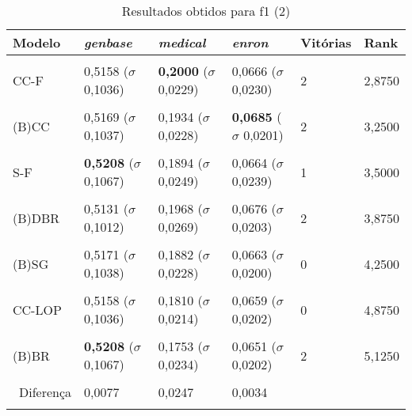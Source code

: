 \begin{table}[htbp]
	\centering
	\caption{Resultados obtidos para f1 (2)}
		\begin{tabular}
        { p{0.88in} p{0.88in} p{0.88in} p{0.88in} p{0.88in} p{0.88in} }
        
        \hline
Modelo & \textit{genbase} & \textit{medical} & \textit{enron} & \textbf{Vitórias} & \textbf{Rank} \\ 
\hline \\

CC-F & 0,5158 \newline ($\sigma$ 0,1036) & \textbf{0,2000} \newline ($\sigma$ 0,0229) & 0,0666 \newline ($\sigma$ 0,0230) & 2 & 2,8750 \\ \\
(B)CC & 0,5169 \newline ($\sigma$ 0,1037) & 0,1934 \newline ($\sigma$ 0,0228) & \textbf{0,0685} \newline ($\sigma$ 0,0201) & 2 & 3,2500 \\ \\
S-F & \textbf{0,5208} \newline ($\sigma$ 0,1067) & 0,1894 \newline ($\sigma$ 0,0249) & 0,0664 \newline ($\sigma$ 0,0239) & 1 & 3,5000 \\ \\
(B)DBR & 0,5131 \newline ($\sigma$ 0,1012) & 0,1968 \newline ($\sigma$ 0,0269) & 0,0676 \newline ($\sigma$ 0,0203) & 2 & 3,8750 \\ \\
(B)SG & 0,5171 \newline ($\sigma$ 0,1038) & 0,1882 \newline ($\sigma$ 0,0228) & 0,0663 \newline ($\sigma$ 0,0200) & 0 & 4,2500 \\ \\
CC-LOP & 0,5158 \newline ($\sigma$ 0,1036) & 0,1810 \newline ($\sigma$ 0,0214) & 0,0659 \newline ($\sigma$ 0,0202) & 0 & 4,8750 \\ \\
(B)BR & \textbf{0,5208} \newline ($\sigma$ 0,1067) & 0,1753 \newline ($\sigma$ 0,0234) & 0,0651 \newline ($\sigma$ 0,0202) & 2 & 5,1250 \\ \\

\hline \ 
 Diferença & 0,0077 & 0,0247 & 0,0034 &  &  \\ 
\hline \\

        \end{tabular}
	\label{tab:metricsForF1_2}
\end{table}
